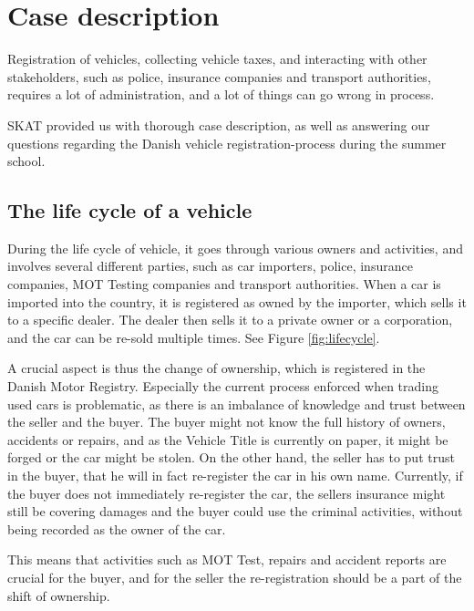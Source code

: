 \documentclass[oneside,a4paper,10pts,article]{memoir}
\begin{document}
\chapter{Case description}
\label{sec:case}
Registration of vehicles, collecting vehicle taxes, and interacting
with other stakeholders, such as police, insurance companies and
transport authorities, requires a lot of administration, and a lot of
things can go wrong in process.

SKAT provided us with thorough case description, as well as answering
our questions regarding the Danish vehicle registration-process during
the summer school.

\section{The life cycle of a vehicle}
During the life cycle of vehicle, it goes through various owners and
activities, and involves several different parties, such as car
importers, police, insurance companies, MOT Testing companies and
transport authorities. When a car is imported into the country, it is
registered as owned by the importer, which sells it to a specific
dealer. The dealer then sells it to a private owner or a corporation,
and the car can be re-sold multiple times. See Figure \ref{fig:lifecycle}.

A crucial aspect is thus the change of ownership, which is registered
in the Danish Motor Registry. Especially the current process enforced
when trading used cars is problematic, as there is an imbalance of
knowledge and trust between the seller and the buyer. The buyer might
not know the full history of owners, accidents or repairs, and as the
Vehicle Title is currently on paper, it might be forged or the car
might be stolen. On the other hand, the seller has to put trust in the
buyer, that he will in fact re-register the car in his own
name. Currently, if the buyer does not immediately re-register the
car, the sellers insurance might still be covering damages and the
buyer could use the criminal activities, without being recorded as the
owner of the car.

This means that activities such as MOT Test, repairs and accident
reports are crucial for the buyer, and for the seller the
re-registration should be a part of the shift of ownership.
\end{document}
